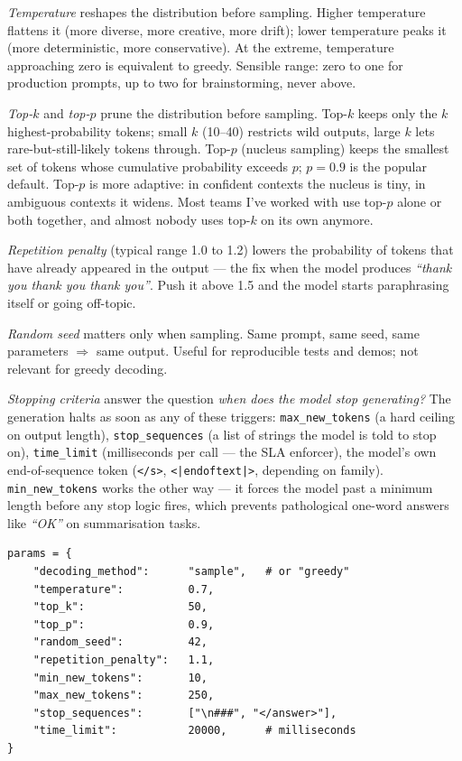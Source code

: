 \emph{Temperature} reshapes the distribution before sampling. Higher temperature flattens it (more diverse, more creative, more drift); lower temperature peaks it (more deterministic, more conservative). At the extreme, temperature approaching zero is equivalent to greedy. Sensible range: zero to one for production prompts, up to two for brainstorming, never above.

\emph{Top-$k$} and \emph{top-$p$} prune the distribution before sampling. Top-$k$ keeps only the $k$ highest-probability tokens; small $k$ (10--40) restricts wild outputs, large $k$ lets rare-but-still-likely tokens through. Top-$p$ (nucleus sampling) keeps the smallest set of tokens whose cumulative probability exceeds $p$; $p = 0.9$ is the popular default. Top-$p$ is more adaptive: in confident contexts the nucleus is tiny, in ambiguous contexts it widens. Most teams I've worked with use top-$p$ alone or both together, and almost nobody uses top-$k$ on its own anymore.

\emph{Repetition penalty} (typical range 1.0 to 1.2) lowers the probability of tokens that have already appeared in the output --- the fix when the model produces \emph{``thank you thank you thank you''}. Push it above 1.5 and the model starts paraphrasing itself or going off-topic.

\emph{Random seed} matters only when sampling. Same prompt, same seed, same parameters $\Rightarrow$ same output. Useful for reproducible tests and demos; not relevant for greedy decoding.

\emph{Stopping criteria} answer the question \emph{when does the model stop generating?} The generation halts as soon as any of these triggers: \texttt{max\_new\_tokens} (a hard ceiling on output length), \texttt{stop\_sequences} (a list of strings the model is told to stop on), \texttt{time\_limit} (milliseconds per call --- the SLA enforcer), the model's own end-of-sequence token (\texttt{</s>}, \texttt{<|endoftext|>}, depending on family). \texttt{min\_new\_tokens} works the other way --- it forces the model past a minimum length before any stop logic fires, which prevents pathological one-word answers like \emph{``OK''} on summarisation tasks.

\begin{examplebox}[title=\textbf{A complete parameter dictionary}]
\begin{lstlisting}[style=pythonstyle]
params = {
    "decoding_method":      "sample",   # or "greedy"
    "temperature":          0.7,
    "top_k":                50,
    "top_p":                0.9,
    "random_seed":          42,
    "repetition_penalty":   1.1,
    "min_new_tokens":       10,
    "max_new_tokens":       250,
    "stop_sequences":       ["\n###", "</answer>"],
    "time_limit":           20000,      # milliseconds
}
\end{lstlisting}
\end{examplebox}

